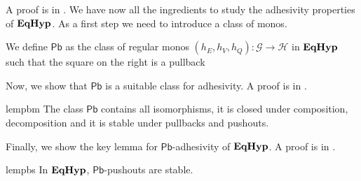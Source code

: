 \documentclass[3p]{elsarticle}
\newcommand{\pbc}{\mathsf{Pb}}
\newcommand{\catname}[1]{\textbf{\textup{#1}}}
\newcommand{\EqHyp}{\catname{EqHyp}} %
\theoremstyle{remark}
\theoremstyle{definition}
\begin{document}
A proof is in .
We have now all the ingredients to study the adhesivity properties of $\EqHyp$.  As a first step we need to introduce a class of monos.

\noindent
\begin{minipage}[l]{.83\linewidth}
\begin{defi}
	We define $\pbc$ as the class of  regular monos $(h_E, h_V, h_Q)\colon \mathcal{G}\to \mathcal{H}$ in $\EqHyp$ such that the square on the right is a pullback
\end{defi}
\end{minipage} \hfill 
\begin{minipage}[r]{.15\linewidth}
 \end{minipage}

\vspace{.1cm}
Now, we show that $\pbc$ is a suitable class for adhesivity. A proof is in .

\begin{restatable}{lem}{pbm}\label{lem:pbmono}
	The class $\pbc$ contains all isomorphisms, it is closed under composition, decomposition and it is stable under pullbacks and pushouts.
\end{restatable}

\vspace{.1cm}
Finally, we show the key lemma for $\pbc$-adhesivity of $\EqHyp$. A proof is in .

\begin{restatable}{lem}{pbs}\label{lemma:stab}
	In $\EqHyp$, $\pbc$-pushouts are stable.
\end{restatable}
\end{document}
